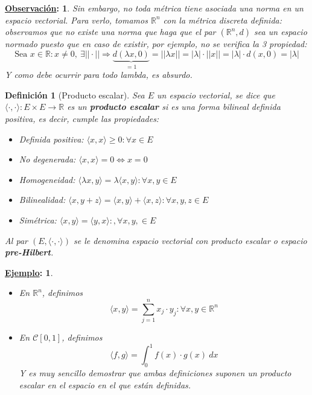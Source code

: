 \documentclass[10pt,a4paper,openright]{book}
\theoremstyle{break}
\newtheorem*{defi}{Definición}
\newtheorem*{obs}{\underline{Observación}:}
\newtheorem*{ej}{\underline{Ejemplo}:}
\newcommand{\dif}[1]{\ d#1}
\begin{document}
\begin{obs}
Sin embargo, no toda métrica tiene asociada una norma en un espacio vectorial. Para verlo, tomamos $\mathbb R^n$ con la métrica discreta definida: observamos que no existe una norma que haga que el par $(\mathbb R^n, d)$ sea un espacio normado puesto que en caso de existir, por ejemplo, no se verifica la 3 propiedad:
$$\mbox{Sea }x\in \mathbb R: x\neq 0, \ \exists ||\cdot||\Rightarrow\underbrace{d(\lambda x , 0)}_{=1} = ||\lambda x|| = |\lambda|\cdot ||x|| = |\lambda| \cdot d(x,0) = |\lambda|$$
Y como debe ocurrir para todo lambda, es absurdo.
\end{obs}

\begin{defi}[Producto escalar]
Sea $E$ un espacio vectorial, se dice que $\langle \cdot, \cdot\rangle: E\times E \rightarrow \mathbb R$ es un \textbf{producto escalar} si es una forma bilineal definida positiva, es decir, cumple las propiedades:
\begin{itemize}
\item Definida positiva: $\langle x,x \rangle \geq 0 : \forall x \in E$
\item No degenerada: $\langle x,x \rangle = 0 \Leftrightarrow x = 0$
\item Homogeneidad: $\langle \lambda x, y \rangle = \lambda \langle x,y\rangle : \forall x, y \in E$
\item Bilinealidad: $\langle x,y+z\rangle = \langle x,y\rangle + \langle x,z\rangle : \forall x, y ,z \in E$
\item Simétrica: $\langle x,y\rangle = \langle y,x\rangle: ,\forall x, y ,\in E$
\end{itemize}
Al par $(E, \langle \cdot, \cdot\rangle)$ se le denomina espacio vectorial con producto escalar o espacio \textbf{pre-Hilbert}.
\end{defi}

\begin{ej}
\begin{itemize}
\item En $\mathbb{R}^n$, definimos $$\langle x,y\rangle = \sum_{j=1}^{n} x_j \cdot y_j : \forall x,y \in \mathbb{R}^n$$

\item En $\mathcal{C}[0,1]$, definimos $$\langle f,g \rangle = \int_{0}^{1} f(x) \cdot g(x) \dif{x}$$
Y es muy sencillo demostrar que ambas definiciones suponen un producto escalar en el espacio en el que están definidas.
\end{itemize}
\end{ej}
\end{document}
